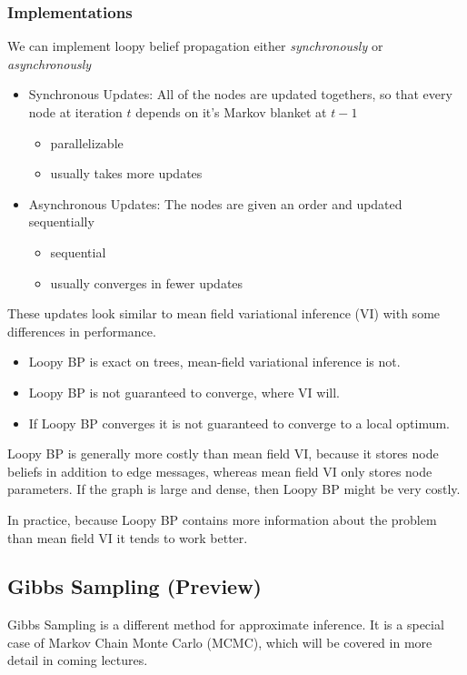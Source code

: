 \documentclass{article}
\begin{document}
\subsubsection{Implementations}
We can implement loopy belief propagation either \emph{synchronously} or \emph{asynchronously}
\begin{itemize}
	\item Synchronous Updates: All of the nodes are updated togethers, so that every node at iteration $t$ depends on it's Markov blanket at $t-1$
	\begin{itemize}
		\item parallelizable
		\item usually takes more updates
	\end{itemize}
	\item Asynchronous Updates: The nodes are given an order and updated sequentially
	\begin{itemize}
		\item sequential
		\item usually converges in fewer updates
	\end{itemize}
\end{itemize}

These updates look similar to mean field variational inference (VI) with some differences in performance.
\begin{itemize}
	\item Loopy BP is exact on trees, mean-field variational inference is not.
	\item Loopy BP is not guaranteed to converge, where VI will.
	\item If Loopy BP converges it is not guaranteed to converge to a local optimum.
\end{itemize}
Loopy BP is generally more costly than mean field VI, because it stores node beliefs in addition to edge messages, whereas mean field VI only stores node parameters. If the graph is large and dense, then Loopy BP might be very costly. 

In practice, because Loopy BP contains more information about the problem than mean field VI it tends to work better.

\subsection{Gibbs Sampling (Preview)}

Gibbs Sampling is a different method for approximate inference. It is a special case of Markov Chain Monte Carlo (MCMC), which will be covered in more detail in coming lectures. 
\end{document}
